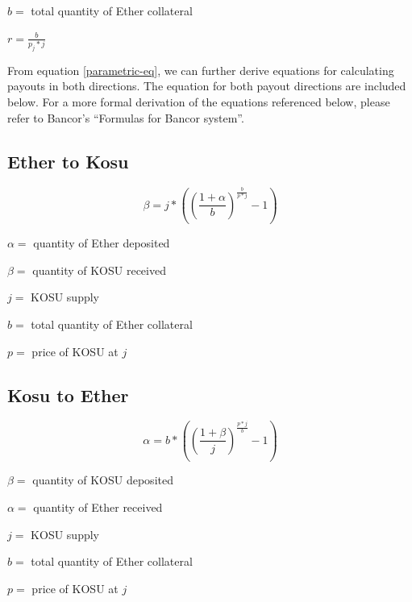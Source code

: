 \documentclass[10pt]{article}
\begin{document}
$b = $ total quantity of Ether collateral

$r = \frac{b}{p_j*j}$ 

\bigskip

From equation \ref{parametric-eq}, we can further derive equations for calculating payouts in both directions. The equation for both payout directions are included below. For a more formal derivation of the equations referenced below, please refer to Bancor’s “Formulas for Bancor system”\cite{bancor-formulas}. 
\subsection{Ether to Kosu}\label{token-distribution-eth-kosu}
\begin{equation}
  \beta = j* ((\frac{1+\alpha}{b})^{\frac{b}{p*j}} - 1)
\end{equation}
\medskip

\noindent $\alpha =$ quantity of Ether deposited
\medskip

\noindent $\beta =$ quantity of KOSU received
\medskip

\noindent $j =$ KOSU supply
\medskip

\noindent $b = $ total quantity of Ether collateral
\medskip

\noindent $p =$ price of KOSU at $j$
\medskip

\subsection{Kosu to Ether}\label{token-distribution-kosu-eth}
\begin{equation}
  \alpha = b* ((\frac{1+\beta}{j})^{\frac{p*j}{b}} - 1)
\end{equation}
\medskip

\noindent $\beta =$ quantity of KOSU deposited
\medskip

\noindent $\alpha =$ quantity of Ether received
\medskip

\noindent $j =$ KOSU supply
\medskip

\noindent $b = $ total quantity of Ether collateral
\medskip

\noindent $p =$ price of KOSU at $j$
\medskip
\clearpage
\pagebreak

\end{document}
